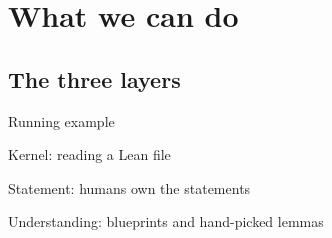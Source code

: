 \section{What we can do}
\subsection{The three layers}

\begin{frame}{Running example}
\end{frame}

\begin{frame}{Kernel: reading a Lean file}
\end{frame}

\begin{frame}{Statement: humans own the statements}
\end{frame}

\begin{frame}{Understanding: blueprints and hand-picked lemmas}
\end{frame}


